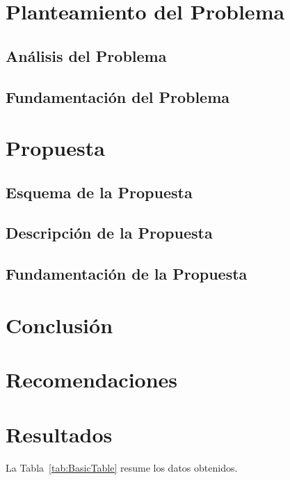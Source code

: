 \documentclass[12pt]{article}
\begin{document}
\section{Planteamiento del Problema}

\subsection{Análisis del Problema}
\lipsum[1]

\subsection{Fundamentación del Problema}
\lipsum[1]

\section{Propuesta}

\subsection{Esquema de la Propuesta}
\lipsum[1]

\subsection{Descripción de la Propuesta}
\lipsum[1]

\subsection{Fundamentación de la Propuesta}
\lipsum[1]

\section{Conclusión}
\lipsum[1]

\section{Recomendaciones}
\lipsum[8]

\section{Resultados}

La Tabla~\ref{tab:BasicTable} resume los datos obtenidos. \lipsum[15]
\end{document}
